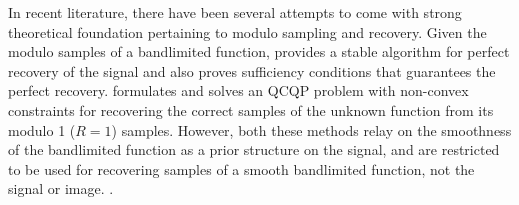 In recent literature, there have been several attempts to come with strong theoretical foundation pertaining to modulo sampling and recovery.  Given the modulo samples of a bandlimited function, \cite{Bhandari} provides a stable algorithm for perfect recovery of the signal and also proves sufficiency conditions that guarantees the perfect recovery. \cite{Cucuringu2017} formulates and solves an QCQP problem with non-convex constraints for recovering the correct samples of the unknown function from its modulo 1 ($R =1$) samples. However, both these methods relay on the smoothness of the bandlimited function as a prior structure on the signal, and are restricted to be used for recovering samples of a smooth bandlimited function, not the signal or image. .

